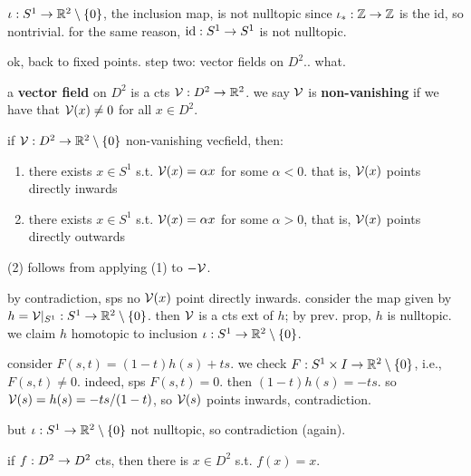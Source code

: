 \begin{xmp}[source=Primary Source Material]
    $\iota:S^{1}\rightarrow\mathbb{R}^{2}\setminus\left\{{0}\right\}$, the inclusion map, is not nulltopic
    since $\iota_{*}:\mathbb{Z}\rightarrow\mathbb{Z}$ is the id, so nontrivial.
    for the same reason, $\textrm{id}:S^{1}\rightarrow S^{1}$ is not nulltopic.
\end{xmp}
ok, back to fixed points. step two: vector fields on $D^{2}$.. what.

\begin{defn}
    a \textbf{vector field} on $D^{2}$ is a cts $\mathcal{V}:D^{2}\rightarrow\mathbb{R}^{2}$.
    we say $\mathcal{V}$ is \textbf{non-vanishing} if we have that $\mathcal{V}(x)\neq0$ for all $x\in D^{2}$.
\end{defn}

\begin{prop}
    if $\mathcal{V}:D^{2}\rightarrow\mathbb{R}^{2}\setminus\left\{{0}\right\}$ non-vanishing vecfield, then: \vspace{-4mm}
    \begin{enumerate}[(1)]
        \item there exists $x\in S^{1}$ s.t. $\mathcal{V}(x)=\alpha x$ for some $\alpha<0$.
            that is, $\mathcal{V}(x)$ points directly inwards
        \item there exists $x\in S^{1}$ s.t. $\mathcal{V}(x)=\alpha x$ for some $\alpha>0$,
            that is, $\mathcal{V}(x)$ points directly outwards
    \end{enumerate}
\end{prop}

\begin{pf}[source=Primary Source Material]
    (2) follows from applying (1) to $-\mathcal{V}$.

    by contradiction, sps no $\mathcal{V}(x)$ point directly inwards.
    consider the map given by $h=\mathcal{V}\rvert_{S^{1}}:S^{1}\rightarrow\mathbb{R}^{2}\setminus\left\{{0}\right\}$.
    then $\mathcal{V}$ is a cts ext of $h$; by prev. prop, $h$ is nulltopic.
    we claim $h$ homotopic to inclusion $\iota:S^{1}\rightarrow\mathbb{R}^{2}\setminus\left\{{0}\right\}$.

    consider $F(s,t)=(1-t)h(s)+ts$.
    we check $F:S^{1}\times I\rightarrow\mathbb{R}^{2}\setminus\left\{{0}\right\}$, i.e., $F(s,t)\neq0$.
    indeed, sps $F(s,t)=0$. then $(1-t)h(s)=-ts$.
    so $\mathcal{V}(s)=h(s)=-ts/(1-t)$, so $\mathcal{V}(s)$ points inwards, contradiction.

    but $\iota:S^{1}\rightarrow\mathbb{R}^{2}\setminus\left\{{0}\right\}$ not nulltopic, so contradiction (again).
\end{pf}

\begin{thm}[title=Brouwer's Fixed Point Theorem (for the 2D disc)]
    if $f:D^{2}\rightarrow D^{2}$ cts, then there is $x\in D^{2}$ s.t. $f(x)=x$.
\end{thm}

